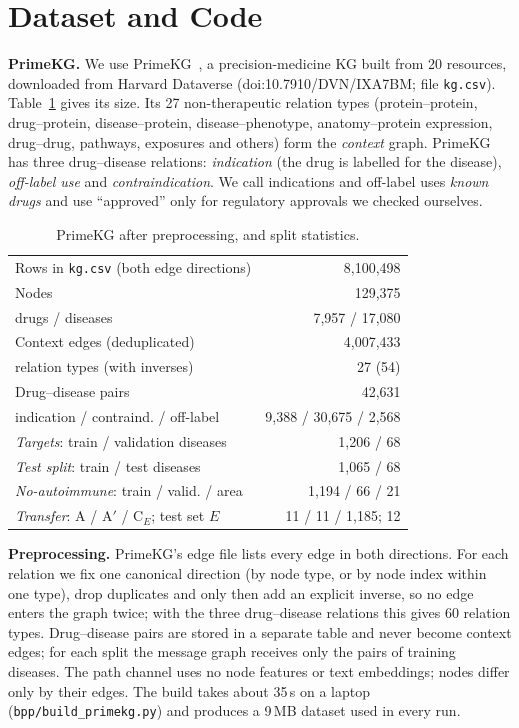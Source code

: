 \documentclass[journal]{IEEEtran}
\begin{document}
\section{Dataset and Code}
\label{sec:data}
\textbf{PrimeKG.} We use PrimeKG~\cite{chandak2023primekg}, a precision-medicine KG built from 20 resources, downloaded from Harvard Dataverse (doi:10.7910/DVN/IXA7BM; file \texttt{kg.csv}). Table~\ref{tab:data} gives its size. Its 27 non-therapeutic relation types (protein--protein, drug--protein, disease--protein, disease--phenotype, anatomy--protein expression, drug--drug, pathways, exposures and others) form the \emph{context} graph. PrimeKG has three drug--disease relations: \emph{indication} (the drug is labelled for the disease), \emph{off-label use} and \emph{contraindication}. We call indications and off-label uses \emph{known drugs} and use ``approved'' only for regulatory approvals we checked ourselves.

\begin{table}[!t]
\centering
\caption{PrimeKG after preprocessing, and split statistics.}
\label{tab:data}
\small
\setlength{\tabcolsep}{4pt}
\begin{tabular*}{\columnwidth}{@{\extracolsep{\fill}}lr@{}}
\toprule
Rows in \texttt{kg.csv} (both edge directions) & 8,100,498 \\
Nodes & 129,375 \\
\quad drugs / diseases & 7,957 / 17,080 \\
Context edges (deduplicated) & 4,007,433 \\
\quad relation types (with inverses) & 27 (54) \\
Drug--disease pairs & 42,631 \\
\quad indication / contraind. / off-label & 9,388 / 30,675 / 2,568 \\
\midrule
\emph{Targets}: train / validation diseases & 1,206 / 68 \\
\emph{Test split}: train / test diseases & 1,065 / 68 \\
\emph{No-autoimmune}: train / valid. / area & 1,194 / 66 / 21 \\
\emph{Transfer}: A / A$'$ / C$_E$; test set $E$ & 11 / 11 / 1,185; 12 \\
\bottomrule
\end{tabular*}
\end{table}

\textbf{Preprocessing.} PrimeKG's edge file lists every edge in both directions. For each relation we fix one canonical direction (by node type, or by node index within one type), drop duplicates and only then add an explicit inverse, so no edge enters the graph twice; with the three drug--disease relations this gives 60 relation types. Drug--disease pairs are stored in a separate table and never become context edges; for each split the message graph receives only the pairs of training diseases. The path channel uses no node features or text embeddings; nodes differ only by their edges. The build takes about 35\,s on a laptop (\texttt{bpp/build\_primekg.py}) and produces a 9\,MB dataset used in every run.
\end{document}
